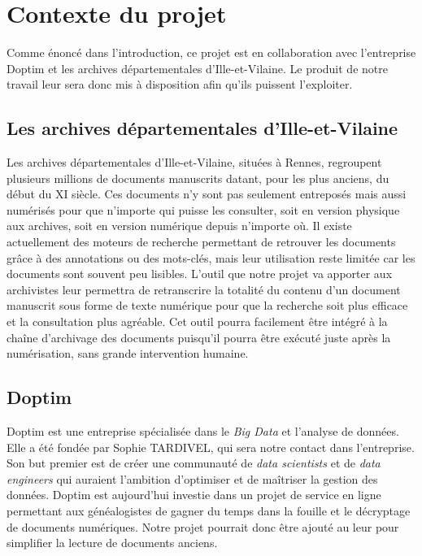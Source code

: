 \chapter{Contexte du projet}

Comme énoncé dans l’introduction, ce projet est en collaboration avec l’entreprise
Doptim et les archives départementales d’Ille-et-Vilaine. Le produit de notre travail
leur sera donc mis à disposition afin qu’ils puissent l’exploiter.

\section{Les archives départementales d’Ille-et-Vilaine}

Les archives départementales d’Ille-et-Vilaine, situées à Rennes, regroupent plusieurs
millions de documents manuscrits datant, pour les plus anciens, du début du XI siècle.
Ces documents n’y sont pas seulement entreposés mais aussi numérisés pour que n’importe qui
puisse les consulter, soit en version physique aux archives, soit en version numérique
depuis n’importe où. Il existe actuellement des moteurs de recherche permettant de retrouver
les documents grâce à des annotations ou des mots-clés, mais leur utilisation reste limitée
car les documents sont souvent peu lisibles. L'outil que notre projet va apporter aux
archivistes leur permettra de retranscrire la totalité du contenu d’un document manuscrit
sous forme de texte numérique pour que la recherche soit plus efficace et la consultation
plus agréable. Cet outil pourra facilement être intégré à la chaîne d’archivage des documents
puisqu’il pourra être exécuté juste après la numérisation, sans grande intervention humaine.

\section{Doptim}

Doptim est une entreprise spécialisée dans le \textit{Big Data} et l’analyse de données.
Elle a été fondée par Sophie TARDIVEL, qui sera notre contact dans l’entreprise.
Son but premier est de créer une communauté de \textit{data scientists} et de
\textit{data engineers} qui auraient l’ambition d’optimiser et de maîtriser la gestion
des données. Doptim est aujourd’hui investie dans un projet de service en ligne permettant
aux généalogistes de gagner du temps dans la fouille et le décryptage de documents numériques.
Notre projet pourrait donc être ajouté au leur pour simplifier la lecture de documents anciens.

